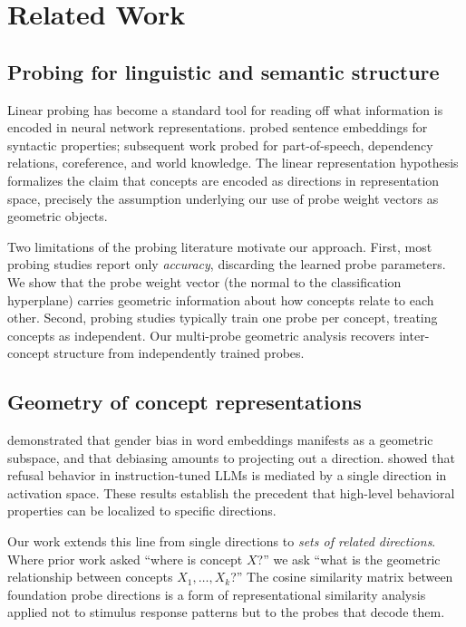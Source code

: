 \section{Related Work}\label{related-work}

\subsection{Probing for linguistic and semantic structure}\label{probing-for-linguistic-and-semantic-structure}

Linear probing \citep{alain2017probes} has become a standard tool
for reading off what information is encoded in neural network
representations. \citet{conneau2018probing} probed sentence
embeddings for syntactic properties; subsequent work probed for
part-of-speech, dependency relations, coreference, and world
knowledge. The linear representation hypothesis
\citep{park2024linear} formalizes the claim that concepts are
encoded as directions in representation space, precisely the
assumption underlying our use of probe weight vectors as geometric
objects.

Two limitations of the probing literature motivate our approach.
First, most probing studies report only \emph{accuracy}, discarding the
learned probe parameters. We show that the probe weight vector
(the normal to the classification hyperplane) carries geometric
information about how concepts relate to each other. Second,
probing studies typically train one probe per concept, treating
concepts as independent. Our multi-probe geometric analysis
recovers inter-concept structure from independently trained probes.

\subsection{Geometry of concept representations}\label{geometry-of-concept-representations}

\citet{bolukbasi2016gender} demonstrated that gender bias in word
embeddings manifests as a geometric subspace, and that debiasing
amounts to projecting out a direction. \citet{arditi2024refusal}
showed that refusal behavior in instruction-tuned LLMs is mediated
by a single direction in activation space. These results establish
the precedent that high-level behavioral properties can be localized
to specific directions.

Our work extends this line from single directions to \emph{sets of
related directions}. Where prior work asked ``where is concept \(X\)?''
we ask ``what is the geometric relationship between concepts
\(X_1, \ldots, X_k\)?'' The cosine similarity matrix between
foundation probe directions is a form of representational similarity
analysis \citep[RSA;][]{kriegeskorte2008rsa} applied not to stimulus
response patterns but to the probes that decode them.

